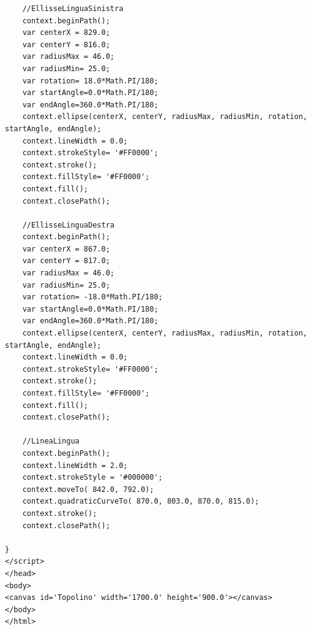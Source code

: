 \documentclass[a4paper]{article}
\begin{document}
\begin{verbatim}
	//EllisseLinguaSinistra
	context.beginPath();
	var centerX = 829.0;
	var centerY = 816.0;
	var radiusMax = 46.0;
	var radiusMin= 25.0;
	var rotation= 18.0*Math.PI/180;
	var startAngle=0.0*Math.PI/180;
	var endAngle=360.0*Math.PI/180;
	context.ellipse(centerX, centerY, radiusMax, radiusMin, rotation, startAngle, endAngle);
	context.lineWidth = 0.0;
	context.strokeStyle= '#FF0000';
	context.stroke();
	context.fillStyle= '#FF0000';
	context.fill();
	context.closePath();

	//EllisseLinguaDestra
	context.beginPath();
	var centerX = 867.0;
	var centerY = 817.0;
	var radiusMax = 46.0;
	var radiusMin= 25.0;
	var rotation= -18.0*Math.PI/180;
	var startAngle=0.0*Math.PI/180;
	var endAngle=360.0*Math.PI/180;
	context.ellipse(centerX, centerY, radiusMax, radiusMin, rotation, startAngle, endAngle);
	context.lineWidth = 0.0;
	context.strokeStyle= '#FF0000';
	context.stroke();
	context.fillStyle= '#FF0000';
	context.fill();
	context.closePath();

	//LineaLingua
	context.beginPath();
	context.lineWidth = 2.0;
	context.strokeStyle = '#000000';
	context.moveTo( 842.0, 792.0);
	context.quadraticCurveTo( 870.0, 803.0, 870.0, 815.0);
	context.stroke();
	context.closePath();

}
</script>
</head>
<body>
<canvas id='Topolino' width='1700.0' height='900.0'></canvas>
</body>
</html>
\end{verbatim}

\newpage
\end{document}
